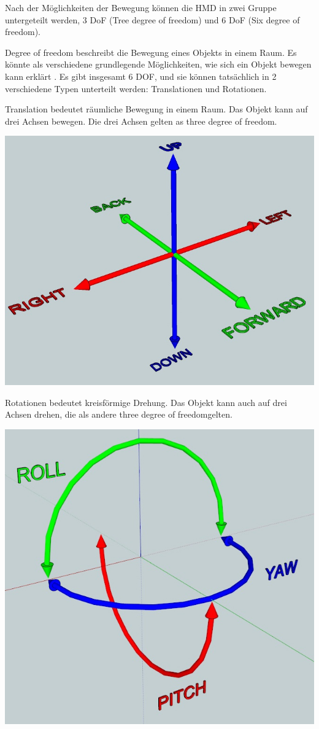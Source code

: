  Nach der Möglichkeiten der Bewegung können die HMD in zwei Gruppe untergeteilt werden, 3 DoF (Tree degree of freedom) und 6 DoF (Six degree of freedom).
  
  Degree of freedom beschreibt die Bewegung eines Objekts in einem Raum. Es könnte als \glqq verschiedene grundlegende Möglichkeiten, wie sich ein Objekt bewegen kann \grqq erklärt \citep{25}. Es gibt insgesamt 6 DOF, und sie können tatsächlich in 2 verschiedene Typen unterteilt werden: Translationen und Rotationen.
  
  Translation bedeutet räumliche Bewegung in einem Raum. Das Objekt kann auf drei Achsen bewegen. Die drei Achsen gelten as \glqq three degree of freedom\grqq .
  
  \includegraphics[width=\textwidth]{images/translations-diagram.jpg}
  
  Rotationen bedeutet kreisförmige Drehung. Das Objekt kann auch auf drei Achsen drehen, die als andere \glqq three degree of freedom\grqq gelten.
  
  \includegraphics[width=\textwidth]{images/rotations-diagram.jpg}
  

